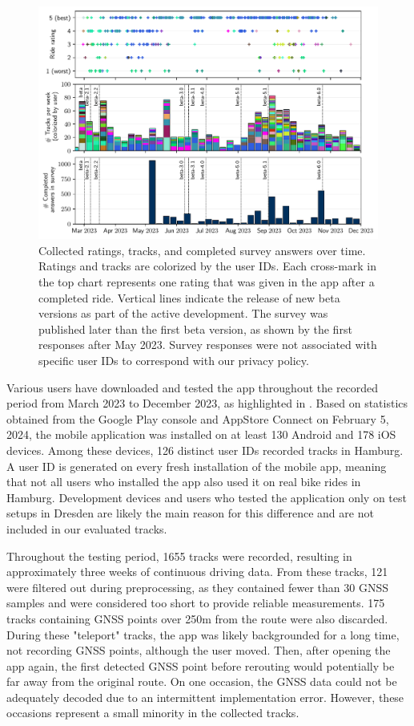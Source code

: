 \begin{figure}[!b]
\caption{Collected ratings, tracks, and completed survey answers over time. Ratings and tracks are colorized by the user IDs. Each cross-mark in the top chart represents one rating that was given in the app after a completed ride. Vertical lines indicate the release of new beta versions as part of the active development. The survey was published later than the first beta version, as shown by the first responses after May 2023. Survey responses were not associated with specific user IDs to correspond with our privacy policy.}\label{fig:app-usage-over-time}
\includegraphics[width=\linewidth]{images/app-usage-over-time.pdf}
\end{figure}

Various users have downloaded and tested the app throughout the recorded period from March 2023 to December 2023, as highlighted in . Based on statistics obtained from the Google Play console and AppStore Connect on February 5, 2024, the mobile application was installed on at least 130 Android and 178 iOS devices. Among these devices, 126 distinct user IDs recorded tracks in Hamburg. A user ID is generated on every fresh installation of the mobile app, meaning that not all users who installed the app also used it on real bike rides in Hamburg. Development devices and users who tested the application only on test setups in Dresden are likely the main reason for this difference and are not included in our evaluated tracks.

Throughout the testing period, 1655 tracks were recorded, resulting in approximately three weeks of continuous driving data. From these tracks, 121 were filtered out during preprocessing, as they contained fewer than 30 GNSS samples and were considered too short to provide reliable measurements. 175 tracks containing GNSS points over 250m from the route were also discarded. During these "teleport" tracks, the app was likely backgrounded for a long time, not recording GNSS points, although the user moved. Then, after opening the app again, the first detected GNSS point before rerouting would potentially be far away from the original route. On one occasion, the GNSS data could not be adequately decoded due to an intermittent implementation error. However, these occasions represent a small minority in the collected tracks.


